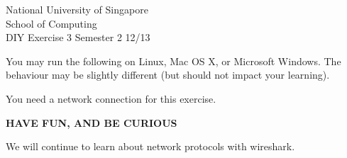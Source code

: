 \documentclass[a4paper,11pt]{exam}
\begin{document}
\extraheadheight{.5in}
%
{\large\sf National University of Singapore\\ School of Computing \\
\LARGE\sf DIY Exercise 3}%
{\large\sf Semester 2 12/13}
\firstpageheadrule
\pagestyle{headandfoot}

You may run the following on Linux, Mac OS X, or Microsoft Windows.  The behaviour may be slightly different (but should not impact your learning).

You need a network connection for this exercise.  

\begin{center}
	\textbf\textsf{HAVE FUN, AND BE CURIOUS}
\end{center}

We will continue to learn about network protocols with wireshark. 
\end{document}
